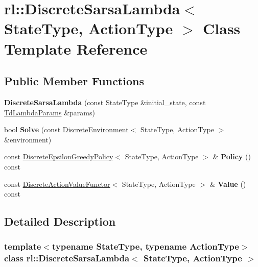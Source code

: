 \hypertarget{classrl_1_1_discrete_sarsa_lambda}{}\section{rl\+:\+:Discrete\+Sarsa\+Lambda$<$ State\+Type, Action\+Type $>$ Class Template Reference}
\label{classrl_1_1_discrete_sarsa_lambda}
\subsection*{Public Member Functions}
\begin{DoxyCompactItemize}
\item 
\hypertarget{classrl_1_1_discrete_sarsa_lambda_ad2b039c0f79c239a0f22ec33647f545e}{}\label{classrl_1_1_discrete_sarsa_lambda_ad2b039c0f79c239a0f22ec33647f545e} 
{\bfseries Discrete\+Sarsa\+Lambda} (const State\+Type \&initial\+\_\+state, const \hyperlink{structrl_1_1_td_lambda_params}{Td\+Lambda\+Params} \&params)
\item 
\hypertarget{classrl_1_1_discrete_sarsa_lambda_a622e3b6761479b7487a57c730d522ca3}{}\label{classrl_1_1_discrete_sarsa_lambda_a622e3b6761479b7487a57c730d522ca3} 
bool {\bfseries Solve} (const \hyperlink{classrl_1_1_discrete_environment}{Discrete\+Environment}$<$ State\+Type, Action\+Type $>$ \&environment)
\item 
\hypertarget{classrl_1_1_discrete_sarsa_lambda_af6d5b91b1b9c27d11e299fff4e500e25}{}\label{classrl_1_1_discrete_sarsa_lambda_af6d5b91b1b9c27d11e299fff4e500e25} 
const \hyperlink{classrl_1_1_discrete_epsilon_greedy_policy}{Discrete\+Epsilon\+Greedy\+Policy}$<$ State\+Type, Action\+Type $>$ \& {\bfseries Policy} () const
\item 
\hypertarget{classrl_1_1_discrete_sarsa_lambda_a1098971513a37f2816140c2d2d0ac232}{}\label{classrl_1_1_discrete_sarsa_lambda_a1098971513a37f2816140c2d2d0ac232} 
const \hyperlink{structrl_1_1_discrete_action_value_functor}{Discrete\+Action\+Value\+Functor}$<$ State\+Type, Action\+Type $>$ \& {\bfseries Value} () const
\end{DoxyCompactItemize}


\subsection{Detailed Description}
\subsubsection*{template$<$typename State\+Type, typename Action\+Type$>$\newline
class rl\+::\+Discrete\+Sarsa\+Lambda$<$ State\+Type, Action\+Type $>$}



